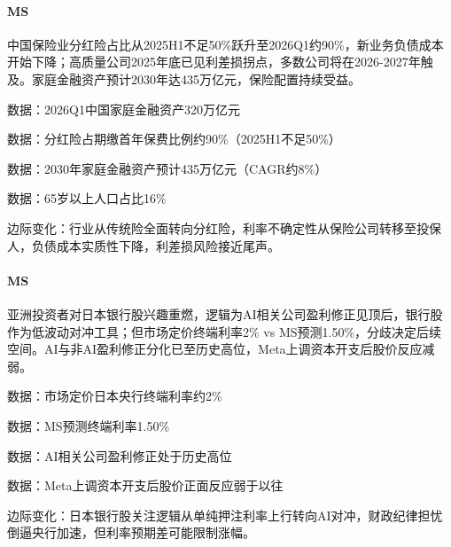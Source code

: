 \documentclass[11pt]{ctexart}
\begin{document}
\paragraph{MS} 中国保险业分红险占比从2025H1不足50\%跃升至2026Q1约90\%，新业务负债成本开始下降；高质量公司2025年底已见利差损拐点，多数公司将在2026-2027年触及。家庭金融资产预计2030年达435万亿元，保险配置持续受益。
{\small\color{refgray}数据：2026Q1中国家庭金融资产320万亿元\par}
{\small\color{refgray}数据：分红险占期缴首年保费比例约90\%（2025H1不足50\%）\par}
{\small\color{refgray}数据：2030年家庭金融资产预计435万亿元（CAGR约8\%）\par}
{\small\color{refgray}数据：65岁以上人口占比16\%\par}
{\small\color{refgray}边际变化：行业从传统险全面转向分红险，利率不确定性从保险公司转移至投保人，负债成本实质性下降，利差损风险接近尾声。\par}
\paragraph{MS} 亚洲投资者对日本银行股兴趣重燃，逻辑为AI相关公司盈利修正见顶后，银行股作为低波动对冲工具；但市场定价终端利率2\% vs MS预测1.50\%，分歧决定后续空间。AI与非AI盈利修正分化已至历史高位，Meta上调资本开支后股价反应减弱。
{\small\color{refgray}数据：市场定价日本央行终端利率约2\%\par}
{\small\color{refgray}数据：MS预测终端利率1.50\%\par}
{\small\color{refgray}数据：AI相关公司盈利修正处于历史高位\par}
{\small\color{refgray}数据：Meta上调资本开支后股价正面反应弱于以往\par}
{\small\color{refgray}边际变化：日本银行股关注逻辑从单纯押注利率上行转向AI对冲，财政纪律担忧倒逼央行加速，但利率预期差可能限制涨幅。\par}
\end{document}
